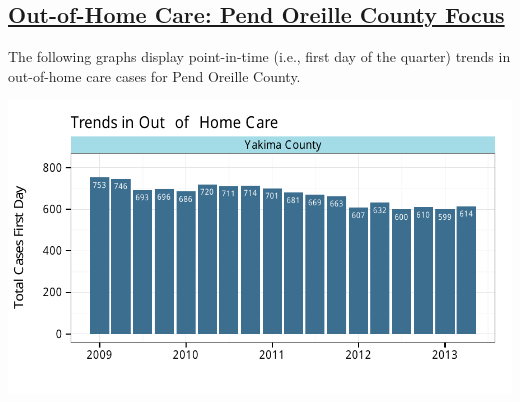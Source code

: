 \documentclass{article}\usepackage[]{graphicx}\usepackage[]{color}
\makeatletter
\def\maxwidth{ %
  \ifdim\Gin@nat@width>\linewidth
    \linewidth
  \else
    \Gin@nat@width
  \fi
}
\newenvironment{knitrout}{}{} %
\makeatother
\begin{document}
\begin{minipage}{\textwidth}
\subsection{\href{http://www.partnersforourchildren.org/child-well-being/visualizations/out-home-care/trends}
 {Out-of-Home Care: Pend Oreille County Focus}
}
The following graphs display point-in-time (i.e., first day of the quarter) trends in out-of-home care cases for
Pend Oreille County.\\[1pt]
\begin{knitrout}
\color{fgcolor}

{\centering \includegraphics[width=\maxwidth]{figure/ooh_focus} 

}



\end{knitrout}

\end{minipage}
\end{document}
